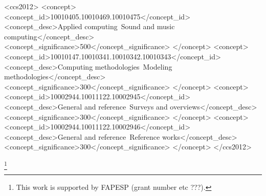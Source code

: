 \documentclass[format=acmsmall, review=false, screen=true]{acmart}
\begin{document}
%
%
\begin{CCSXML}
  <ccs2012>
    <concept>
      <concept_id>10010405.10010469.10010475</concept_id>
      <concept_desc>Applied computing~Sound and music computing</concept_desc>
      <concept_significance>500</concept_significance>
    </concept>
    <concept>
      <concept_id>10010147.10010341.10010342.10010343</concept_id>
      <concept_desc>Computing methodologies~Modeling methodologies</concept_desc>
      <concept_significance>300</concept_significance>
    </concept>
    <concept>
      <concept_id>10002944.10011122.10002945</concept_id>
      <concept_desc>General and reference~Surveys and overviews</concept_desc>
      <concept_significance>300</concept_significance>
    </concept>
    <concept>
      <concept_id>10002944.10011122.10002946</concept_id>
      <concept_desc>General and reference~Reference works</concept_desc>
      <concept_significance>300</concept_significance>
    </concept>
  </ccs2012>
\end{CCSXML}


%
%




\thanks{This work is supported by FAPESP (grant number etc ???).}


\maketitle

\renewcommand{\shortauthors}{R. Fabbri et al.}


\end{document}
